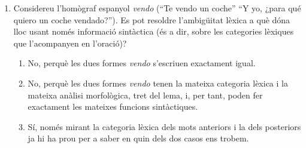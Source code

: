 \begin{enumerate}
\item Considereu l'homògraf espanyol \emph{vendo} (``Te vendo un
  coche'' ``Y yo, ¿para qué quiero un coche vendado?''). Es pot
  resoldre l'ambigüitat lèxica a què dóna lloc usant només informació
  sintàctica (és a dir, sobre les categories lèxiques que l'acompanyen
  en l'oració)?
  \begin{enumerate}
  \item No, perquè les dues formes \emph{vendo} s'escriuen exactament
    igual.
  \item No, perquè les dues formes \emph{vendo} tenen la mateixa
    categoria lèxica i la mateixa anàlisi morfològica, tret del lema,
    i, per tant, poden fer exactament les mateixes funcions
    sintàctiques.
  \item Sí, només mirant la categoria lèxica dels mots anteriors i la
    dels posteriors ja hi ha prou per a saber en quin dels dos casos
    ens trobem.
  \end{enumerate}


\end{enumerate}

